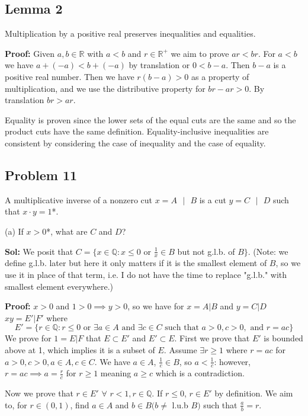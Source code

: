 \documentclass{amsart}
\begin{document}
\subsection*{Lemma 2}  Multiplication by a positive real preserves inequalities and equalities.

\medskip
\noindent \textbf{Proof:} Given $a,b\in \mathbb{R}$ with $a<b$ and $r\in\mathbb{R}^+$ we aim to prove $ar<br$. For $a<b$ we have $a+(-a)<b+(-a)$
by translation or $0<b-a$. Then $b-a$ is a positive real number. Then we have $r(b-a)>0$ as a property of multiplication, and we use the 
distributive property for $br-ar>0$. By translation $br>ar$. 

Equality is proven since the lower sets of the equal cuts are the same and so the product cuts have the same definition. Equality-inclusive
inequalities are consistent by considering the case of inequality and the case of equality.




\newpage
\subsection*{Problem 11}
\noindent A multiplicative inverse of a nonzero cut $x = A\text{ } | \text{ }B$ is a cut $y = C\text{ } | \text{ }D$ such that
 $x\cdot y=1$*.

\indent (a) If $x>0$*, what are $C$ and $D$?

\medskip
\noindent \textbf{Sol:} We posit that $C = \{x\in\mathbb{Q}: x\leq 0 $ or $\frac{1}{x}\in B$ but not g.l.b. of $B\}$.
(Note: we define g.l.b. later but
here it only matters if it is the smallest element of $B$, so we use it in place of that term, i.e. I do not have the time to replace "g.l.b." with smallest
element everywhere.)

\medskip
\noindent \textbf{Proof:} $x>0$ and $1>0\implies y>0$, so we have for $x=A|B$ and $y=C|D$ $xy= E'|F'$ where 
$$E' = \{r\in\mathbb{Q}:r\leq0 \text{ or } \exists a\in A \text{ and } \exists c\in C \text{ such that } a>0, c>0, \text{ and } r=ac\}$$
We prove for $1= E|F$ that $E\subset E'$ and $E'\subset E$. First we prove that $E'$ is bounded above at 1, which implies it is a 
subset of $E$. Assume $\exists r\geq 1$ where $r=ac$ for $a>0, c>0, a\in A, c\in C$. We have $a\in A$, $\frac{1}{c}\in B$, so $a<\frac{1}{c}$:
however, $r=ac\implies a=\frac{r}{c}$ for $r\geq 1$ meaning $a\geq c$ which is a contradiction.

\medskip
\noindent Now we prove that $r\in E'$ $\forall$ $r<1, r\in\mathbb{Q}$. If $r\leq 0$, $r\in E'$ by definition. We aim to, for $r\in (0,1)$,
find $a\in A$ and $b\in B (b\neq $ l.u.b $B)$ such that $\frac{a}{b}=r$. 
\end{document}
